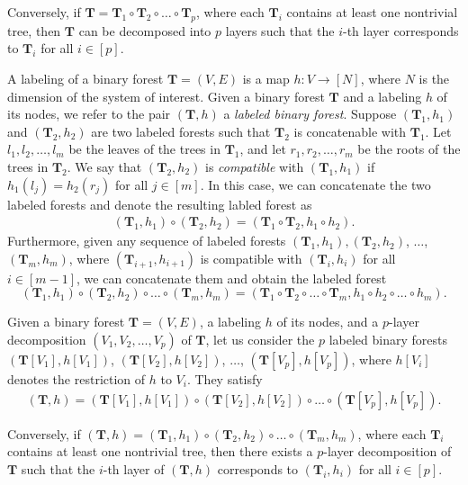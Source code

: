 \documentclass[superscriptaddress,onecolumn,nofootinbib,longbibliography,a4paper,accepted=2026-09-29]{quantumarticle}
\theoremstyle{plain}
\theoremstyle{definition}
\numberwithin{thm}{section}
\numberwithin{assumption}{section}
\numberwithin{lemma}{section}
\numberwithin{prop}{section}
\numberwithin{cor}{section}
\numberwithin{definition}{section}
\numberwithin{rmk}{section}
\numberwithin{equation}{section}
\newcommand{\mbf}{\mathbf{T}}
\begin{document}
Conversely, if $\mbf=\mbf_1\circ \mbf_2 \circ \dots \circ \mbf_p$, where each $\mbf_i$ contains at least one nontrivial tree, then $\mbf$ can be decomposed into $p$ layers such that the $i$-th layer corresponds to $\mbf_i$ for all $i \in [p]$.

A labeling of a binary forest $\mbf=(V, E)$ is a map $h: V \to [N]$, where $N$ is the dimension of the system of interest. Given a binary forest $\mbf$ and a labeling $h$ of its nodes, we refer to the pair $(\mbf, h)$ a \emph{labeled binary forest}. Suppose $(\mbf_1, h_1)$ and $(\mbf_2, h_2)$ are two labeled forests such that $\mbf_2$ is concatenable with $\mbf_1$. Let $l_1,l_2,\dots,l_m$ be the leaves of the trees in $\mbf_1$, and let 
$r_1,r_2,\dots,r_m$ be the roots of the trees in $\mbf_2$.  
We say that $(\mbf_2, h_2)$ is \emph{compatible} with $(\mbf_1, h_1)$ if $h_1(l_j)=h_2(r_j)$ for all $j \in [m]$. In this case, we can concatenate the two labeled forests and denote the resulting labled forest as 
\begin{align}
(\mbf_1, h_1) \circ (\mbf_2, h_2) = (\mbf_1 \circ \mbf_2, h_1 \circ h_2).    
\end{align}
Furthermore, given any sequence of labeled forests $(\mbf_1, h_1), (\mbf_2, h_2)$, $\dots$, $(\mbf_m, h_m)$, where $(\mbf_{i+1}, h_{i+1})$ is compatible with $(\mbf_i, h_i)$ for all $i \in [m-1]$, we can concatenate them and obtain the labeled forest
$$(\mbf_1, h_1) \circ (\mbf_2, h_2) \circ \dots \circ (\mbf_m, h_m)
=(\mbf_1 \circ \mbf_2  \circ \dots \circ \mbf_m, 
h_1 \circ h_2 \circ \dots \circ h_m).$$

Given a binary forest $\mbf=(V, E)$, a labeling $h$ of its nodes, and a $p$-layer decomposition $(V_1, V_2, \dots, V_p)$ of $\mbf$, let us consider the $p$ labeled binary forests $(\mbf[V_1], h[V_1])$, $(\mbf[V_2], h[V_2])$, $\dots$, $(\mbf[V_p], h[V_p])$, where $h[V_i]$ denotes the restriction of $h$ to $V_i$. They satisfy
\begin{align}
    (\mbf, h) = (\mbf[V_1], h[V_1]) \circ (\mbf[V_2], h[V_2]) \circ \dots \circ (\mbf[V_p], h[V_p]).
\end{align}

Conversely, if $(\mbf, h) = (\mbf_1, h_1) \circ (\mbf_2, h_2) \circ \dots \circ (\mbf_m, h_m)$, where each $\mbf_i$ contains at least one nontrivial tree, then there exists a $p$-layer decomposition of $\mbf$ such that the $i$-th layer of $(\mbf, h)$ corresponds to $(\mbf_i, h_i)$ for all $i \in [p]$.
\end{document}
